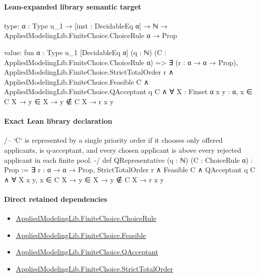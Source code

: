\documentclass[10pt]{article}
\begin{document}
\paragraph{Lean-expanded library semantic target}
\begin{ReviewVerbatim}
type:
{α : Type u_1} → [inst : DecidableEq α] → ℕ → AppliedModelingLib.FiniteChoice.ChoiceRule α → Prop

value:
fun {α : Type u_1} [DecidableEq α] (q : ℕ) (C : AppliedModelingLib.FiniteChoice.ChoiceRule α) =>
  ∃ (r : α → α → Prop),
    AppliedModelingLib.FiniteChoice.StrictTotalOrder r ∧
      AppliedModelingLib.FiniteChoice.Feasible C ∧
        AppliedModelingLib.FiniteChoice.QAcceptant q C ∧ ∀ {X : Finset α} {x y : α}, x ∈ C X → y ∈ X → y ∉ C X → r x y
\end{ReviewVerbatim}

\paragraph{Exact Lean library declaration}
\begin{ReviewVerbatim}
/--
`C` is represented by a single priority order if it chooses only offered
applicants, is q-acceptant, and every chosen applicant is above every rejected
applicant in each finite pool.
-/
def QRepresentative (q : ℕ) (C : ChoiceRule α) : Prop :=
  ∃ r : α → α → Prop,
    StrictTotalOrder r ∧ Feasible C ∧ QAcceptant q C ∧
      ∀ {X x y}, x ∈ C X → y ∈ X → y ∉ C X → r x y
\end{ReviewVerbatim}

\paragraph{Direct retained dependencies}
\begin{itemize}\raggedright
\item \hyperlink{library-prerequisite-5dea5c3766008208}{Applied\allowbreak{}Modeling\allowbreak{}Lib.\allowbreak{}Finite\allowbreak{}Choice.\allowbreak{}Choice\allowbreak{}Rule}
\item \hyperlink{library-prerequisite-e24a27bd29c81560}{Applied\allowbreak{}Modeling\allowbreak{}Lib.\allowbreak{}Finite\allowbreak{}Choice.\allowbreak{}Feasible}
\item \hyperlink{library-prerequisite-162a2197f72e3870}{Applied\allowbreak{}Modeling\allowbreak{}Lib.\allowbreak{}Finite\allowbreak{}Choice.\allowbreak{}Q\allowbreak{}Acceptant}
\item \hyperlink{library-prerequisite-20b36bb360cd045f}{Applied\allowbreak{}Modeling\allowbreak{}Lib.\allowbreak{}Finite\allowbreak{}Choice.\allowbreak{}Strict\allowbreak{}Total\allowbreak{}Order}
\end{itemize}
\end{document}
